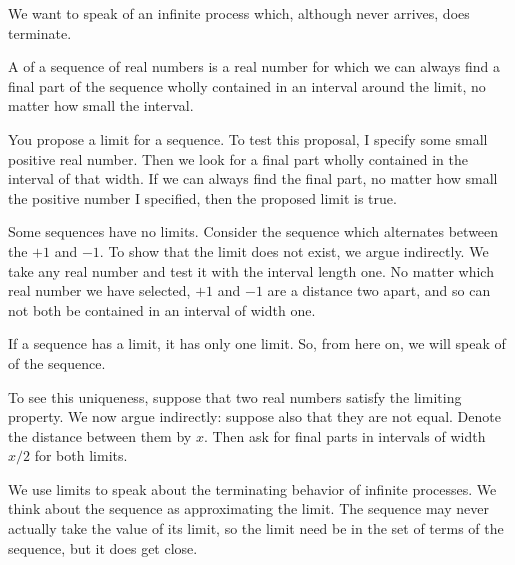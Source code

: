 
\sbasic




\sstart



We want to speak of an
infinite process which,
although never arrives,
does terminate.


A
of a sequence of real
numbers is a real number
for which we can always
find a final part of the
sequence wholly contained
in an interval around the limit,
no matter how small the interval.

You propose a limit
for a sequence.
To test this proposal,
I specify some small
positive real number.
Then we look for a
final part wholly contained
in the interval of that
width.
If we can always find the
final part, no matter
how small the positive
number I specified,
then the proposed limit
is true.


Some sequences have no
limits.
Consider the sequence
which alternates between
the $+1$
and $-1$.
To show that the limit
does not exist, we
argue indirectly.
We take any real
number and test it
with the interval length
one.
No matter which
real number we have
selected,
$+1$ and
$-1$ are a
distance two apart,
and so can not
both be contained
in an interval
of width one.



If a sequence has a limit,
it has only one limit.
So, from here on, we will speak
of  of
the sequence.

To see this uniqueness,
suppose that two
real numbers satisfy the
limiting property.
We now argue indirectly:
suppose also that they are
not equal.
Denote the distance between
them by $x$.
Then ask for final parts
in intervals of width $x/2$
for both limits.


We use limits to speak about
the terminating behavior of
infinite processes.
We think about the sequence
as approximating the limit.
The sequence may never
actually take the value
of its limit, so the
limit need be in the
set of terms of the sequence,
but it does get close.

